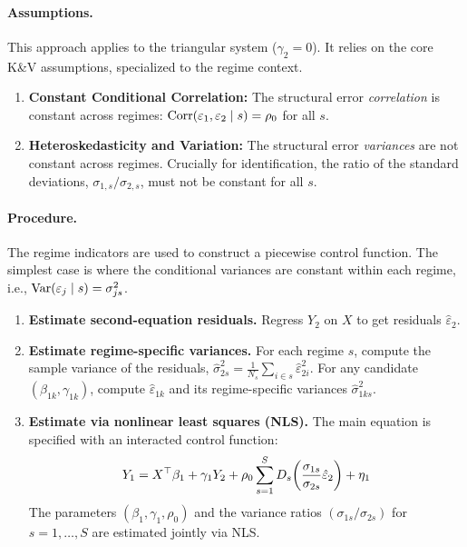\paragraph{Assumptions.}
This approach applies to the triangular system ($\gamma_2=0$). It relies on the core K\&V assumptions, specialized to the regime context.
\begin{enumerate}
    \itemsep1pt
    \item \textbf{Constant Conditional Correlation:} The structural error \emph{correlation} is constant across regimes: $\operatorname{Corr}(\varepsilon_1, \varepsilon_2 \mid s) = \rho_0$ for all $s$.
    \item \textbf{Heteroskedasticity and Variation:} The structural error \emph{variances} are not constant across regimes. Crucially for identification, the ratio of the standard deviations, $\sigma_{1,s}/\sigma_{2,s}$, must not be constant for all $s$.
\end{enumerate}

\paragraph{Procedure.}
The regime indicators are used to construct a piecewise control function. The simplest case is where the conditional variances are constant within each regime, i.e., $\operatorname{Var}(\varepsilon_j \mid s) = \sigma_{js}^2$.
\begin{enumerate}
    \itemsep2pt
    \item \textbf{Estimate second-equation residuals.} Regress $Y_2$ on $X$ to get residuals $\hat{\varepsilon}_2$.
    \item \textbf{Estimate regime-specific variances.} For each regime $s$, compute the sample variance of the residuals, $\hat{\sigma}_{2s}^2 = \frac{1}{N_s}\sum_{i \in s} \hat{\varepsilon}_{2i}^2$. For any candidate $(\beta_{1k}, \gamma_{1k})$, compute $\hat{\varepsilon}_{1k}$ and its regime-specific variances $\hat{\sigma}_{1ks}^2$.
    \item \textbf{Estimate via nonlinear least squares (NLS).} The main equation is specified with an interacted control function:
    \[
    Y_1 = X^{\top}\beta_1 + \gamma_1 Y_2 + \rho_0 \sum_{s=1}^S D_s \! \left( \frac{\sigma_{1s}}{\sigma_{2s}} \hat{\varepsilon}_2 \right) + \eta_1
    \]
    The parameters $(\beta_1, \gamma_1, \rho_0)$ and the variance ratios $(\sigma_{1s}/\sigma_{2s})$ for $s=1,\dots,S$ are estimated jointly via NLS.
\end{enumerate}

